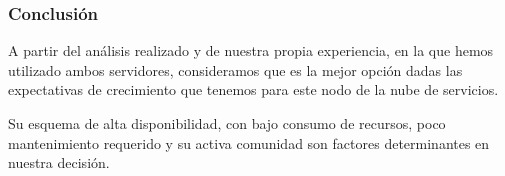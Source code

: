 \subsubsection{Conclusión}

A partir del análisis realizado y de nuestra propia experiencia, en la que hemos utilizado ambos servidores, consideramos que  es la mejor opción dadas las expectativas de crecimiento que tenemos para este nodo de la nube de servicios.

Su esquema de alta disponibilidad, con bajo consumo de recursos, poco mantenimiento requerido y su activa comunidad son factores determinantes en nuestra decisión.
